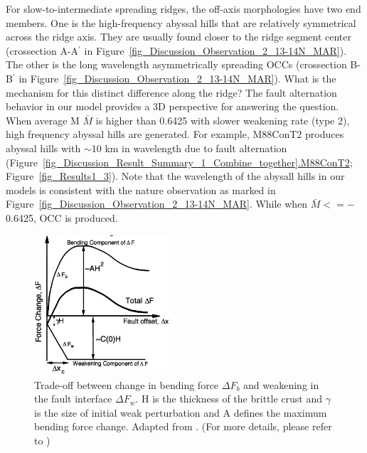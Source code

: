 For slow-to-intermediate spreading ridges, the off-axis morphologies have two end members. One is the high-frequency abyssal hills that are relatively symmetrical across the ridge axis. They are usually found closer to the ridge segment center (crossection A-A$^{\prime}$ in Figure~\hyperref[fig_Discussion_Observation_2_13-14N_MAR]{\ref{fig_Discussion_Observation_2_13-14N_MAR}}). The other is the long wavelength asymmetrically spreading OCCs (crossection B-B$^{\prime}$ in Figure~\hyperref[fig_Discussion_Observation_2_13-14N_MAR]{\ref{fig_Discussion_Observation_2_13-14N_MAR}}). What is the mechanism for this distinct difference along the ridge? The fault alternation behavior in our model provides a 3D perspective for answering the question. When average M $\bar{M}$ is higher than 0.6425 with slower weakening rate (type 2), high frequency abyssal hills are generated. For example, M88ConT2 produces abyssal hills with $\sim$10 km in wavelength due to fault alternation (Figure~\hyperref[fig_Discussion_Result_Summary_1_Combine_together]{\ref{fig_Discussion_Result_Summary_1_Combine_together}.M88ConT2}; Figure~\hyperref[fig_Results1_3]{\ref{fig_Results1_3}}). Note that the wavelength of the abysall hills in our models is consistent with the nature observation as marked in Figure~\hyperref[fig_Discussion_Observation_2_13-14N_MAR]{\ref{fig_Discussion_Observation_2_13-14N_MAR}}. While when $\bar{M} <=-$0.6425, OCC is produced.

\begin{figure}[h]
 \centering
  \includegraphics[width=0.45\textwidth]{./Figures/fig_Results_Weakening_1_tradeOff_bend_weak.png}
 \caption[Trade-off between change in bending force $\Delta F_{b}$ and weakening in the fault interface $\Delta F_{w}$. Adapted from \citep{Lavier2000}.]{Trade-off between change in bending force $\Delta F_{b}$ and weakening in the fault interface $\Delta F_{w}$. H is the thickness of the brittle crust and $\gamma$ is the size of initial weak perturbation and A defines the maximum bending force change. Adapted from \citep{Lavier2000}. (For more details, please refer to \citep{Lavier2000})}
 \label{fig_Results_Weakening_1}
\end{figure}

